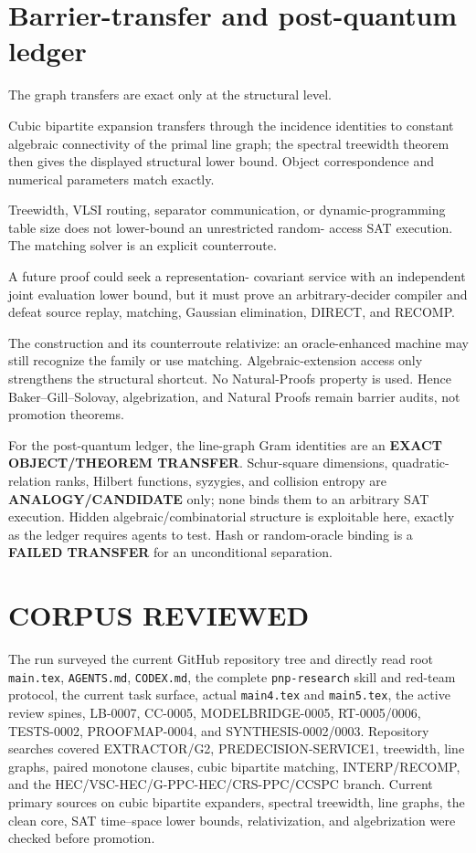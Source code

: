 \documentclass[11pt]{article}
\newcommand{\status}[1]{\textbf{#1}}
\begin{document}
\section{Barrier-transfer and post-quantum ledger}
The graph transfers are exact only at the structural level.
\begin{description}[leftmargin=3.1cm,style=nextline]
\item[THEOREM TRANSFER.] Cubic bipartite expansion transfers through the
incidence identities to constant algebraic connectivity of the primal line
graph; the spectral treewidth theorem then gives the displayed structural
lower bound.  Object correspondence and numerical parameters match exactly.
\item[FAILED TRANSFER.] Treewidth, VLSI routing, separator communication, or
dynamic-programming table size does not lower-bound an unrestricted random-
access SAT execution.  The matching solver is an explicit counterroute.
\item[ANALOGY / CANDIDATE.] A future proof could seek a representation-
covariant service with an independent joint evaluation lower bound, but it
must prove an arbitrary-decider compiler and defeat source replay, matching,
Gaussian elimination, DIRECT, and RECOMP.
\end{description}

The construction and its counterroute relativize: an oracle-enhanced machine
may still recognize the family or use matching.  Algebraic-extension access
only strengthens the structural shortcut.  No Natural-Proofs property is
used.  Hence Baker--Gill--Solovay, algebrization, and Natural Proofs remain
barrier audits, not promotion theorems.

For the post-quantum ledger, the line-graph Gram identities are an
\status{EXACT OBJECT/THEOREM TRANSFER}.  Schur-square dimensions,
quadratic-relation ranks, Hilbert functions, syzygies, and collision entropy
are \status{ANALOGY/CANDIDATE} only; none binds them to an arbitrary SAT
execution.  Hidden algebraic/combinatorial structure is exploitable here,
exactly as the ledger requires agents to test.  Hash or random-oracle binding
is a \status{FAILED TRANSFER} for an unconditional separation.

\section{CORPUS REVIEWED}
The run surveyed the current GitHub repository tree and directly read root
\texttt{main.tex}, \texttt{AGENTS.md}, \texttt{CODEX.md}, the complete
\texttt{pnp-research} skill and red-team protocol, the current task surface,
actual \texttt{main4.tex} and \texttt{main5.tex}, the active review spines,
LB-0007, CC-0005, MODELBRIDGE-0005, RT-0005/0006, TESTS-0002,
PROOFMAP-0004, and SYNTHESIS-0002/0003.  Repository searches covered
EXTRACTOR/G2, PREDECISION-SERVICE1, treewidth, line graphs, paired monotone
clauses, cubic bipartite matching, INTERP/RECOMP, and the
HEC/VSC-HEC/G-PPC-HEC/CRS-PPC/CCSPC branch.  Current primary sources on
cubic bipartite expanders, spectral treewidth, line graphs, the clean core,
SAT time--space lower bounds, relativization, and algebrization were checked
before promotion.
\end{document}
